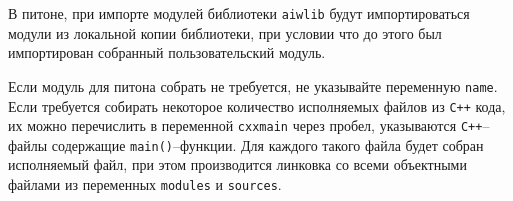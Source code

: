 В питоне, при импорте модулей библиотеки \verb'aiwlib' будут импортироваться модули из локальной копии библиотеки,
при условии что до этого был импортирован собранный пользовательский модуль. 

Если модуль для питона собрать не требуется, не указывайте переменную
\verb'name'. Если требуется собирать некоторое количество исполняемых
файлов из \verb'C++' кода, их можно перечислить в переменной
\verb'cxxmain' через пробел, указываются \verb'C++'--файлы содержащие
\verb'main()'--функции.
Для каждого такого файла будет собран исполняемый файл, при этом
производится линковка со всеми объектными файлами из переменных
\verb'modules' и  \verb'sources'.

